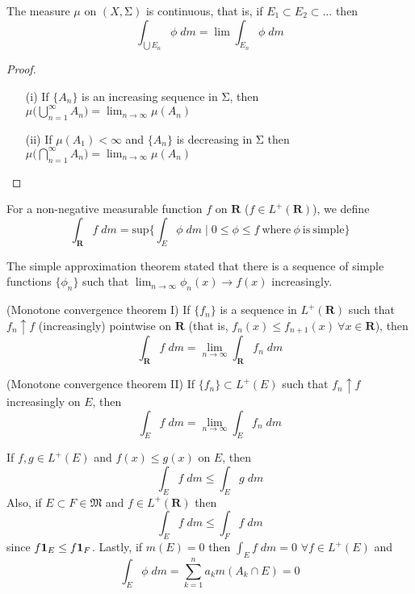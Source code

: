\vspace{2ex}
\begin{thm}
The measure $\mu $ on $(X,\mathrm{\Sigma} )$ is continuous, that is, if $E_1\subset E_2\subset \ldots $ then
\[\int _{\bigcup E_{n}}\phi\; dm=\lim \int _{E_{n}}\phi \; dm\]
\end{thm}
\vspace{2ex}
\begin{proof}
\begin{itemize}
\item[(i)] If $\{A_{n}\}$ is an increasing sequence in $\mathrm{\Sigma} $, then $\mu \Big(\bigcup ^{\infty }_{n=1}A_{n}\Big)=\lim _{n\rightarrow \infty }\mu (A_{n})$
\item[(ii)] If $\mu(A_{1})<\infty $ and $\{A_{n}\}$ is decreasing in $\mathrm{\Sigma} $ then $\mu \Big(\bigcap ^{\infty }_{n=1}A_{n}\Big)=\lim _{n\rightarrow \infty }\mu (A_{n})$
\end{itemize}
\end{proof}
\vspace{2ex}
\begin{defi}
For a non-negative measurable function $f$ on ${\bm R}$ ($f\in L^{+}({\bm R})$), we define
\[\int _{{\bm R}}f\;dm=\mathrm{sup}\Big\{\int _{E}\phi \;dm \;|\; 0\leq \phi \leq f\mathrm{\ where\ }\phi \mathrm{\ is\ simple}\Big\}\]
\end{defi}
\vspace{2ex}
\begin{recall}
The simple approximation theorem stated that there is a sequence of simple functions $\{\phi _{n}\}$ such that $\lim _{n\rightarrow \infty }\phi _{n}(x)\rightarrow f(x)$ increasingly.
\end{recall}
\vspace{2ex}
\begin{thm}
(Monotone convergence theorem I) If $\{f_{n}\}$ is a sequence in $L^{+}({\bm R})$ such that $f_{n}\uparrow f$ (increasingly) pointwise on ${\bm R}$ (that is, $f_{n}(x)\leq  f_{n+1}(x)\ \forall x\in {\bm R}$), then 
\[\int _{{\bm R}}f\; dm=\lim _{n\rightarrow \infty }\int _{{\bm R}}f_{n}\; dm\]
\end{thm}
\vspace{2ex}
\begin{thm}
(Monotone convergence theorem II) If $\{f_{n}\}\subset L^{+}(E)$ such that $f_{n}\uparrow f$ increasingly on $E$, then
\[\int _{E}f\;dm=\lim _{n\rightarrow \infty }\int _{E}f_{n}\;dm\]
\end{thm}
\vspace{2ex}
\begin{lem}
If $f,g\in L^{+}(E)$ and $f(x)\leq g(x)$ on $E$, then
\[\int _{E}f\;dm\leq \int _{E}g\;d m\]
Also, if $E\subset F\in \mathfrak{M}$ and $f\in L^{+}({\bm R})$ then
\[\int _{E}f\;d m\leq \int _{F}f\;d m\]
since $f{\bf 1} _{E}\leq f{\bf 1}_{F}$. Lastly, if $m(E)=0$ then $\int _{E}f\;d m=0 $  $\forall f\in L^{+}(E)$ and
\[\int _{E}\phi \;d m=\sum ^{n}_{k=1}a_{k}m(A_{k}\cap E)=0\]
\end{lem}
